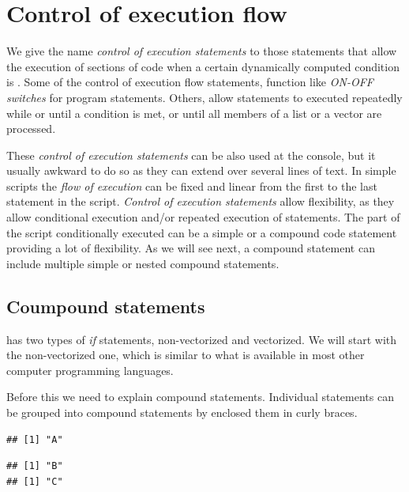 \documentclass[krantz2]{krantz}\usepackage{knitr}%
\begin{document}
\section{Control of execution flow}\label{sec:script:flow:control}
We give the name \emph{control of execution statements} to those statements that allow the execution of sections of code when a certain dynamically computed condition is . Some of the control of execution flow statements, function like \emph{ON-OFF switches} for program statements. Others, allow statements to executed repeatedly while or until a condition is met, or until all members of a list or a vector are processed.

These \emph{control of execution statements} can be also used at the \Rlang console, but it usually awkward to do so as they can extend over several lines of text. In simple scripts the \emph{flow of execution} can be fixed and linear from the first to the last statement in the script. \emph{Control of execution statements} allow flexibility, as they allow conditional execution  and/or repeated execution of statements. The part of the script conditionally executed can be a simple or a compound code statement providing a lot of flexibility. As we will see next, a compound statement can include multiple simple or nested compound statements.

\subsection{Coumpound statements}

\Rpgrm has two types of \emph{if} statements, non-vectorized and vectorized. We will start with the non-vectorized one, which is similar to what is available in most other computer programming languages.

Before this we need to explain compound statements. Individual statements can be grouped into compound statements by enclosed them in curly braces.

\begin{knitrout}\footnotesize
{}\color{fgcolor}\begin{kframe}
\begin{alltt}
\hlstd{(}\hlstd{)}
\end{alltt}
\begin{verbatim}
## [1] "A"
\end{verbatim}
\begin{alltt}
\hlstd{\{}
  \hlstd{(}\hlstd{)}
  \hlstd{(}\hlstd{)}
\hlstd{\}}
\end{alltt}
\begin{verbatim}
## [1] "B"
## [1] "C"
\end{verbatim}
\end{kframe}
\end{knitrout}
\end{document}

